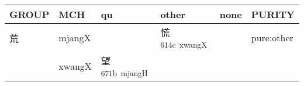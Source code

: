 \documentclass[14pt,a4paper]{scrartcl}
\begin{document}
\begin{longtable}[c]{@{}llllll@{}}
\toprule
\begin{minipage}[b]{0.14\columnwidth}\raggedright\strut
GROUP
\strut\end{minipage} &
\begin{minipage}[b]{0.14\columnwidth}\raggedright\strut
MCH
\strut\end{minipage} &
\begin{minipage}[b]{0.14\columnwidth}\raggedright\strut
qu
\strut\end{minipage} &
\begin{minipage}[b]{0.14\columnwidth}\raggedright\strut
other
\strut\end{minipage} &
\begin{minipage}[b]{0.14\columnwidth}\raggedright\strut
none
\strut\end{minipage} &
\begin{minipage}[b]{0.14\columnwidth}\raggedright\strut
PURITY
\strut\end{minipage}\tabularnewline
\midrule
\endhead
\begin{minipage}[t]{0.14\columnwidth}\raggedright\strut
荒
\strut\end{minipage} &
\begin{minipage}[t]{0.14\columnwidth}\raggedright\strut
mjangX
\strut\end{minipage} &
\begin{minipage}[t]{0.14\columnwidth}\raggedright\strut
\strut\end{minipage} &
\begin{minipage}[t]{0.14\columnwidth}\raggedright\strut
慌\textsuperscript{614c~xwangX}
\strut\end{minipage} &
\begin{minipage}[t]{0.14\columnwidth}\raggedright\strut
\strut\end{minipage} &
\begin{minipage}[t]{0.14\columnwidth}\raggedright\strut
pure:other
\strut\end{minipage}\tabularnewline
\begin{minipage}[t]{0.14\columnwidth}\raggedright\strut
𦣠
\strut\end{minipage} &
\begin{minipage}[t]{0.14\columnwidth}\raggedright\strut
xwangX
\strut\end{minipage} &
\begin{minipage}[t]{0.14\columnwidth}\raggedright\strut
望\textsuperscript{671b~mjangH}
\strut\end{minipage} &

\end{longtable}
\end{document}
